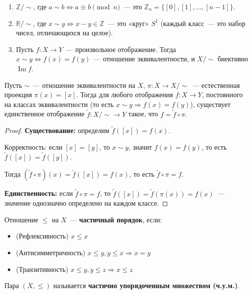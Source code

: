 \documentclass[12pt]{article}
\begin{document}
	\begin{example}
		\begin{enumerate}
			\item $\mathbb{Z} / {\sim}$, где $a \sim b \Leftrightarrow a \equiv b \pmod{n}$~--- это $\mathbb{Z}_n = \{[0], [1], \dots, [n-1]\}$.
			\item $\mathbb{R} / {\sim}$, где $x \sim y \Leftrightarrow x - y \in \mathbb{Z}$~--- это «круг» $S^1$ (каждый класс~--- это набор чисел, отличающихся на целое).
			\item Пусть $f: X \to Y$~--- произвольное отображение. Тогда $x \sim y \Leftrightarrow f(x) = f(y)$~--- отношение эквивалентности, и $X / {\sim}$ биективно $\operatorname{Im} f$.
		\end{enumerate}
	\end{example}
	
	\begin{theorem}
		Пусть $\sim$~--- отношение эквивалентности на $X$, $\pi: X \to X/{\sim}$~--- естественная проекция $\pi(x) = [x]$.
		Тогда для любого отображения $f: X \to Y$, постоянного на классах эквивалентности (то есть $x \sim y \Rightarrow f(x) = f(y)$), существует единственное отображение $\tilde{f}: X/{\sim} \to Y$ такое, что $f = \tilde{f} \circ \pi$.
	\end{theorem}
	
	\begin{proof}
		\textbf{Существование:} определим $\tilde{f}([x]) = f(x)$.
		
		Корректность: если $[x] = [y]$, то $x \sim y$, значит $f(x) = f(y)$, то есть $\tilde{f}([x]) = \tilde{f}([y])$.
		
		Тогда $(\tilde{f} \circ \pi)(x) = \tilde{f}([x]) = f(x)$, то есть $\tilde{f} \circ \pi = f$.
		
		\textbf{Единственность:} если $\tilde{f} \circ \pi = f$, то $\tilde{f}([x]) = \tilde{f}(\pi(x)) = f(x)$~--- значение однозначно определено на каждом классе.
	\end{proof}
	
	\begin{definition}
		Отношение $\leqslant$ на $X$~--- \textbf{частичный порядок}, если:
		\begin{itemize}
			\item (Рефлексивность) $x \leqslant x$
			\item (Антисимметричность) $x \leqslant y, y \leqslant x \Rightarrow x = y$
			\item (Транзитивность) $x \leqslant y, y \leqslant z \Rightarrow x \leqslant z$
		\end{itemize}
		Пара $(X, \leqslant)$ называется \textbf{частично упорядоченным множеством (ч.у.м.)}.
	\end{definition}
	
\end{document}
